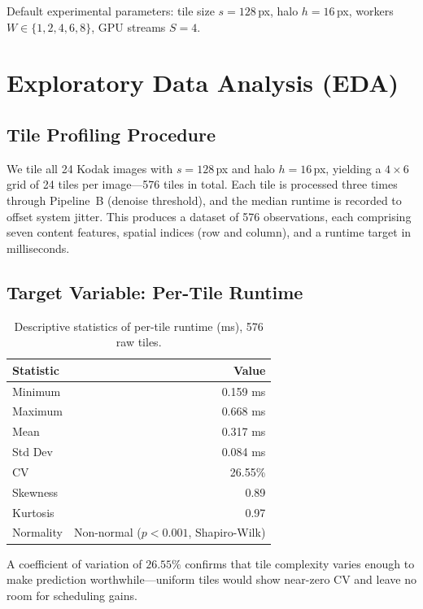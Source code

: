 \documentclass[12pt,a4paper]{article}
\begin{document}
Default experimental parameters: tile size $s=128$\,px, halo $h=16$\,px,
workers $W\in\{1,2,4,6,8\}$, GPU streams $S=4$.

\section{Exploratory Data Analysis (EDA)}

\subsection{Tile Profiling Procedure}

We tile all 24 Kodak images with $s=128$\,px and halo $h=16$\,px, yielding a $4\times6$ grid of 24 tiles per image---576 tiles in total.
Each tile is processed three times through Pipeline~B (denoise threshold), and the median runtime is recorded to offset system jitter.
This produces a dataset of 576 observations, each comprising seven content features, spatial indices (row and column), and a runtime target in milliseconds.

\subsection{Target Variable: Per-Tile Runtime}

\begin{table}[!ht]
\centering
\small
\caption{Descriptive statistics of per-tile runtime (ms), 576 raw tiles.}
\label{tab:runtime_stats}
\begin{tabular}{lr}
\toprule
\textbf{Statistic} & \textbf{Value} \\
\midrule
Minimum   & 0.159 ms \\
Maximum   & 0.668 ms \\
Mean      & 0.317 ms \\
Std Dev   & 0.084 ms \\
CV        & 26.55\% \\
Skewness  & 0.89 \\
Kurtosis  & 0.97 \\
Normality & Non-normal ($p<0.001$, Shapiro-Wilk) \\

\bottomrule
\end{tabular}
\end{table}

A coefficient of variation of $26.55\%$ confirms that tile complexity varies enough to make prediction worthwhile---uniform tiles would show near-zero CV and leave no room for scheduling gains.
\end{document}
